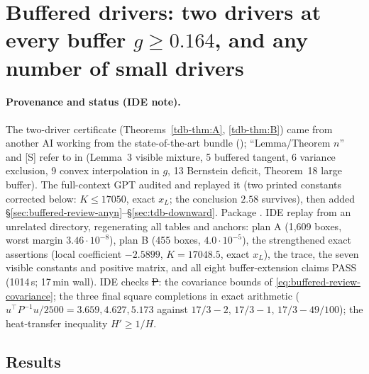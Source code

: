 \providecommand{\Sd}{\textup{[S]}}\providecommand{\cert}[1]{\texttt{#1}}

\section{Buffered drivers: two drivers at every buffer $g\ge0.164$, and any number of small drivers}\label{ch:buffered-drivers}

\paragraph{Provenance and status (IDE note).} The two-driver certificate (Theorems~\ref{tdb-thm:A}, \ref{tdb-thm:B}) came from another AI working from the
state-of-the-art bundle (); ``Lemma/Theorem $n$'' and \Sd{} refer to  in 
(Lemma~3 visible mixture, 5 buffered tangent, 6 variance exclusion, 9 convex interpolation in $g$, 13 Bernstein deficit, Theorem~18 large buffer). The full-context GPT
audited and replayed it (two printed constants corrected below: $K\le17050$, exact $x_L$; the conclusion $2.58$ survives), then added
\S\ref{sec:buffered-review-anyn}--\S\ref{sec:tdb-downward}. Package . IDE replay  from an unrelated directory, regenerating all tables and anchors: plan A (1{,}609 boxes, worst margin $3.46\cdot10^{-8}$), plan B (455 boxes, $4.0\cdot10^{-5}$), the strengthened exact assertions (local coefficient $-2.5899$, $K=17048.5$, exact $x_L$), the trace, the seven visible constants and positive matrix, and all eight buffer-extension claims PASS (1014\,s; 17\,min wall). IDE checks \st{P}: the covariance bounds of
\eqref{eq:buffered-review-covariance}; the three final square completions in exact arithmetic ($u^\top P^{-1}u/2500=3.659,4.627,5.173$ against
$17/3-2,\,17/3-1,\,17/3-49/100$); the heat-transfer inequality $H'\ge1/H$.

\subsection{Results}

